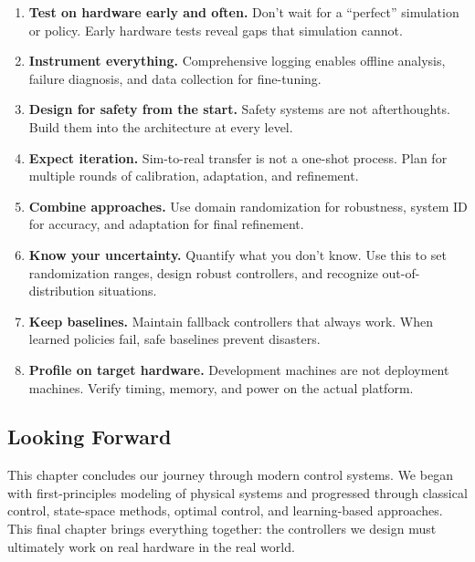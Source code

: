 \begin{enumerate}
    \item \textbf{Test on hardware early and often.} Don't wait for a ``perfect'' simulation or policy. Early hardware tests reveal gaps that simulation cannot.

    \item \textbf{Instrument everything.} Comprehensive logging enables offline analysis, failure diagnosis, and data collection for fine-tuning.

    \item \textbf{Design for safety from the start.} Safety systems are not afterthoughts. Build them into the architecture at every level.

    \item \textbf{Expect iteration.} Sim-to-real transfer is not a one-shot process. Plan for multiple rounds of calibration, adaptation, and refinement.

    \item \textbf{Combine approaches.} Use domain randomization for robustness, system ID for accuracy, and adaptation for final refinement.

    \item \textbf{Know your uncertainty.} Quantify what you don't know. Use this to set randomization ranges, design robust controllers, and recognize out-of-distribution situations.

    \item \textbf{Keep baselines.} Maintain fallback controllers that always work. When learned policies fail, safe baselines prevent disasters.

    \item \textbf{Profile on target hardware.} Development machines are not deployment machines. Verify timing, memory, and power on the actual platform.
\end{enumerate}

\subsection{Looking Forward}

This chapter concludes our journey through modern control systems. We began with first-principles modeling of physical systems and progressed through classical control, state-space methods, optimal control, and learning-based approaches. This final chapter brings everything together: the controllers we design must ultimately work on real hardware in the real world.


